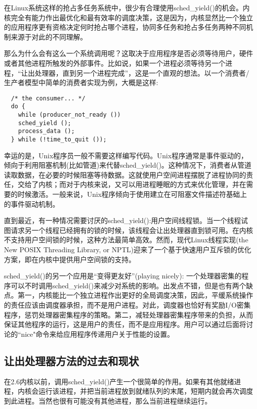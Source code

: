 在Linux系统这样的抢占多任务系统中，很少有合理使用sched\_yield()的机会。内核完全有能力作出最优化和最有效率的调度决策，这是因为，内核显然比一个独立的应用程序更有资格决定何时抢占哪个进程，协同多任务和抢占多任务两种不同机制来源于对此的不同理解。

那么为什么会有这么一个系统调用呢？这取决于应用程序是否必须等待用户，硬件或者其他进程所触发的外部事件。比如说，如果一个进程必须等待另一个进程，“让出处理器，直到另一个进程完成”，这是一个直观的想法。以一个消费者/生产者模型中简单的消费者实现为例，大概是这样:

\begin{lstlisting}
  /* the consumer... */
  do {
    while (producer_not_ready ())
    sched_yield ();
    process_data ();
  } while (!time_to_quit ());
\end{lstlisting}

幸运的是，Unix程序员一般不需要这样编写代码。Unix程序通常是事件驱动的，倾向于利用阻塞机制(比如管道)来代替sched\_yield()。这种情况下，消费者从管道读取数据，在必要的时候阻塞等待数据。这就使用户空间进程摆脱了进程协同的责任，交给了内核；而对于内核来说，又可以用进程睡眠的方式来优化管理，并在需要的时候激活。一般来说，Unix程序倾向于使用建立在可阻塞文件描述符基础上的事件驱动机制。

直到最近，有一种情况需要讨厌的sched\_yield():用户空间线程锁。当一个线程试图请求另一个线程已经拥有的锁的时候，该线程会让出处理器直到锁可用。在内核不支持用户空间锁的时候，这种方法最简单高效。然而，现代Linux线程实现(the New POSIX Threading Library, or NPTL)迎来了一个基于快速用户互斥锁的优化方案，即在内核中提供用户空间锁的支持。

sched\_yield()的另一个应用是“变得更友好”(playing nicely): 一个处理器密集的程序可以不时调用sched\_yield()来减少对系统的影响。出发点不错，但是也有两个缺点。第一，内核能比一个独立进程作出更好的全局调度决策，因此，平缓系统操作的责任应该由调度器承担，而不是用户进程。对此，调度器也恰好有奖励I/O密集程序，惩罚处理器密集程序的策略。第二，减轻处理器密集程序带来的负担，从而保证其他程序的运行，这是用户的责任，而不是应用程序。用户可以通过后面将讨论的``nice"命令来给应用程序传递用户关于性能的设置。

\subsection{让出处理器方法的过去和现状}

在2.6内核以前，调用sched\_yield()产生一个很简单的作用。如果有其他就绪进程，内核会运行该进程，并把当前进程放到就绪队列的末尾，短期内就会再次调度到此进程。当然也很有可能没有其他进程，那么当前进程继续运行。

